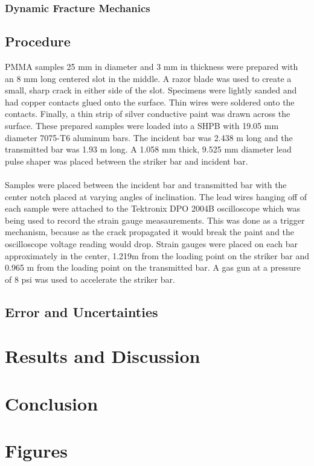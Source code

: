 \documentclass[12pt]{article}
\begin{document}
\subsubsection{Dynamic Fracture Mechanics} %

\subsection{Procedure} %
PMMA samples 25 mm in diameter and 3 mm in thickness were prepared with an 8 mm long centered slot in the middle. A razor blade was used to create a small, sharp crack in either side of the slot. Specimens were lightly sanded and had copper contacts glued onto the surface. Thin wires were soldered onto the contacts. Finally, a thin strip of silver conductive paint was drawn across the surface. These prepared samples were loaded into a SHPB with 19.05 mm diameter 7075-T6 aluminum bars. The incident bar was 2.438 m long and the transmitted bar was 1.93 m long. A 1.058 mm thick, 9.525 mm diameter lead pulse shaper was placed between the striker bar and incident bar.
\\ \\
Samples were placed between the incident bar and transmitted bar with the center notch placed at varying angles of inclination. The lead wires hanging off of each sample were attached to the Tektronix DPO 2004B oscilloscope which was being used to record the strain gauge measaurements. This was done as a trigger mechanism, because as the crack propagated it would break the paint and the oscilloscope voltage reading would drop. Strain gauges were placed on each bar approximately in the center, 1.219m from the loading point on the striker bar and 0.965 m from the loading point on the transmitted bar. A gas gun at a pressure of 8 psi was used to accelerate the striker bar. 

\subsection{Error and Uncertainties} %

\section{Results and Discussion} %

\section{Conclusion} %

\section{Figures} %




\end{document}
